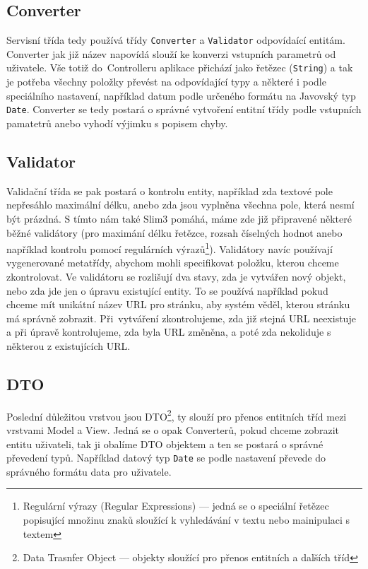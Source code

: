 \subsection{Converter}
Servisní třída tedy používá třídy \verb|Converter| a \verb|Validator| odpovídaící entitám. Converter jak již název napovídá slouží ke konverzi vstupních parametrů od uživatele. Vše totiž do~Controlleru aplikace přichází jako řetězec (\verb|String|) a tak je potřeba všechny položky převést na odpovídající typy a některé i podle speciálního nastavení, například datum podle určeného formátu na Javovský typ \verb|Date|. Converter se tedy postará o správné vytvoření entitní třídy podle vstupních pamatetrů anebo vyhodí výjimku s popisem chyby. 

\subsection{Validator}
Validační třída se pak postará o kontrolu entity, například zda textové pole nepřesáhlo maximální délku, anebo zda jsou vyplněna všechna pole, která nesmí být prázdná. S tímto nám také Slim3 pomáhá, máme zde již připravené některé běžné validátory (pro maximání délku řetězce, rozsah číselných hodnot anebo například kontrolu pomocí regulárních výrazů\footnote{Regulární výrazy (Regular Expressions) --- jedná se o speciální řetězec popisující množinu znaků sloužící k vyhledávání v textu nebo mainipulaci s textem}). Validátory navíc používají vygenerované metatřídy, abychom mohli specifikovat položku, kterou chceme zkontrolovat. Ve validátoru se rozlišují dva stavy, zda je vytvářen nový objekt, nebo zda jde jen o úpravu existující entity. To se používá například pokud chceme mít unikátní název URL pro stránku, aby systém věděl, kterou stránku má správně zobrazit. Při~vytváření zkontrolujeme, zda již stejná URL neexistuje a při úpravě kontrolujeme, zda byla URL změněna, a poté zda nekoliduje s některou z existujících URL. 

\subsection{DTO}
Poslední důležitou vrstvou jsou DTO\footnote{Data Trasnfer Object --- objekty sloužící pro přenos entitních a dalších tříd}, ty slouží pro přenos entitních tříd mezi vrstvami Model a View. Jedná se o opak Converterů, pokud chceme zobrazit entitu uživateli, tak ji obalíme DTO objektem a ten se postará o správné převedení typů. Například datový typ \verb|Date| se podle nastavení převede do správného formátu data pro uživatele. 

